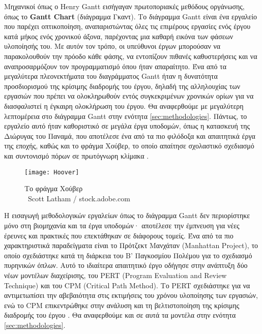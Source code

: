             Μηχανικοί όπως ο Henry Gantt εισήγαγαν πρωτοποριακές μεθόδους οργάνωσης, όπως το \textbf{Gantt Chart} (διάγραμμα Γκαντ). Το διάγραμμα Gantt είναι ένα εργαλείο που παρέχει οπτικοποίηση, αναπαριστώντας όλες τις επιμέρους εργασίες ενός έργου κατά μήκος ενός χρονικού άξονα, παρέχοντας μια καθαρή εικόνα των φάσεων υλοποίησής του. Με αυτόν τον τρόπο, οι υπεύθυνοι έργων μπορούσαν να παρακολουθούν την πρόοδο κάθε φάσης, να εντοπίζουν πιθανές καθυστερήσεις και να αναπροσαρμόζουν τον προγραμματισμό όπου ήταν απαραίτητο. Ένα από τα μεγαλύτερα πλεονεκτήματα του διαγράμματος Gantt ήταν η δυνατότητα προσδιορισμού της κρίσιμης διαδρομής του έργου, δηλαδή της αλληλουχίας των εργασιών που πρέπει να ολοκληρωθούν εντός συγκεκριμένων χρονικών ορίων για να διασφαλιστεί η έγκαιρη ολοκλήρωση του έργου. Θα αναφερθούμε με μεγαλύτερη λεπτομέρεια στο διάγραμμα Gantt στην ενότητα \ref{sec:methodologies}. Πάντως, το εργαλείο αυτό ήταν καθοριστικό σε μεγάλα έργα υποδομών, όπως η κατασκευή της Διώρυγας του Παναμά, που αποτέλεσε ένα από τα πιο φιλόδοξα και απαιτητικά έργα της εποχής, καθώς και το φράγμα Χούβερ, το οποίο απαίτησε σχολαστικό σχεδιασμό και συντονισμό πόρων σε πρωτόγνωρη κλίμακα \cite{strefapmiHooverGreatest}.

            \begin{figure}[h!] \noindent \centering
                \texttt{[image: Hoover]}
                \caption{\centering Το φράγμα Χούβερ \cite{britannicaHoover} \\ {\footnotesize \textcopyright\ Scott Latham / stock.adobe.com}}
            \end{figure}

            Η εισαγωγή μεθοδολογικών εργαλείων όπως το διάγραμμα Gantt δεν περιορίστηκε μόνο στη βιομηχανία και τα έργα υποδομών· αποτέλεσε την έμπνευση για νέες έρευνες και πρακτικές που επεκτάθηκαν σε διάφορους τομείς. Ένα από τα πιο χαρακτηριστικά παραδείγματα είναι το Πρότζεκτ Μανχάταν (Manhattan Project), το οποίο σχεδιάστηκε κατά τη διάρκεια του Β' Παγκοσμίου Πολέμου για το σχεδιασμό πυρηνικών όπλων. Αυτό το ιδιαίτερα απαιτητικό έργο οδήγησε στην ανάπτυξη δύο νέων μοντέλων διαχείρισης, του PERT (Program Evaluation and Review Technique) και του CPM (Critical Path Method). Το PERT σχεδιάστηκε για να αντιμετωπίσει την αβεβαιότητα στις εκτιμήσεις του χρόνου υλοποίησης των εργασιών, ενώ το CPM επικεντρώθηκε στην ανάλυση και τη βελτιστοποίηση της κρίσιμης διαδρομής του έργου \cite{SaylorAcademyProjectManagement}. Θα αναφερθούμε και σε αυτά τα μοντέλα στην ενότητα \ref{sec:methodologies}.


